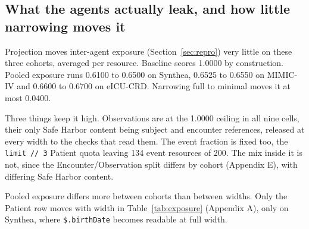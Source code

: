 \subsection{What the agents actually leak, and how little narrowing moves it}
\label{sec:exposure}

Projection moves inter-agent exposure (Section~\ref{sec:repro}) very little on these three cohorts,
averaged per resource. Baseline scores 1.0000 by construction. Pooled exposure runs 0.6100 to 0.6500
on Synthea, 0.6525 to 0.6550 on MIMIC-IV and 0.6600 to 0.6700 on eICU-CRD. Narrowing full to minimal
moves it at most 0.0400.

Three things keep it high. Observations are at the 1.0000 ceiling in all nine cells, their only Safe
Harbor content being subject and encounter references, released at every width to the checks that
read them. The event fraction is fixed too, the \texttt{limit // 3} Patient quota leaving 134 event
resources of 200. The mix inside it is not, since the Encounter/Observation split differs by cohort
(Appendix E), with differing Safe Harbor content.

Pooled exposure differs more between cohorts than between widths. Only the Patient row moves with
width in Table~\ref{tab:exposure} (Appendix A), only on Synthea, where \texttt{\$.birthDate} becomes
readable at full width.
